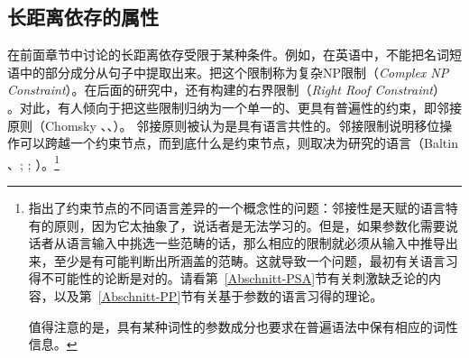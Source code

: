 \subsection{长距离依存的属性}
\label{Abschnitt-Fernabhängigkeiten}

在前面章节中讨论的长距离依存受限于某种条件。例如，在英语中，不能把名词短语中的部分成分从句子中提取出来。\citet[]{Ross67}把这个限制称为复杂NP限制（\emph{Complex NP Constraint}）。在后面的研究中，还有\citet[Section~5.1.2]{Ross67}构建的右界限制（\emph{Right Roof Constraint}）
。对此，有人倾向于把这些限制归纳为一个单一的、更具有普遍性的约束，即邻接原则（Chomsky \citeyear[]{Chomsky73a}、\citeyear[]{Chomsky86b}、\citealp{Baltin81a,Baltin2006a}）。
邻接原则被认为是具有语言共性的。邻接限制说明移位操作可以跨越一个约束节点，而到底什么是约束节点，则取决为研究的语言（Baltin \citeyear[]{Baltin81a}、\citeyear{Baltin2006a}; \citealp[]{Rizzi82b}; \citealp[--40]{Chomsky86b}）。\footnote{
\citet[--540]{Newmeyer2004a} 指出了约束节点的不同语言差异的一个概念性的问题：邻接性是天赋的语言特有的原则，因为它太抽象了，说话者是无法学习的。但是，如果参数化需要说话者从语言输入中挑选一些范畴的话，那么相应的限制就必须从输入中推导出来，至少是有可能判断出所涵盖的范畴。这就导致一个问题，最初有关语言习得不可能性的论断是对的。请看第~\ref{Abschnitt-PSA}节有关刺激缺乏论的内容，以及第~\ref{Abschnitt-PP}节有关基于参数的语言习得的理论。

值得注意的是，具有某种词性的参数成分也要求在普遍语法中保有相应的词性信息。
}
